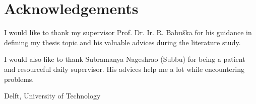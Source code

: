 %
\chapter{Acknowledgements}%

I would like to thank my supervisor Prof. Dr. Ir. R. Babu\v{s}ka for his guidance in defining my thesis topic and his valuable advices during the literature study.

I would also like to thank Subramanya Nageshrao (Subbu) for being a patient and resourceful daily supervisor. His advices help me a lot while encountering problems.

\vspace{30mm}
Delft, University of Technology \hfill \mscname \\
\mscdate